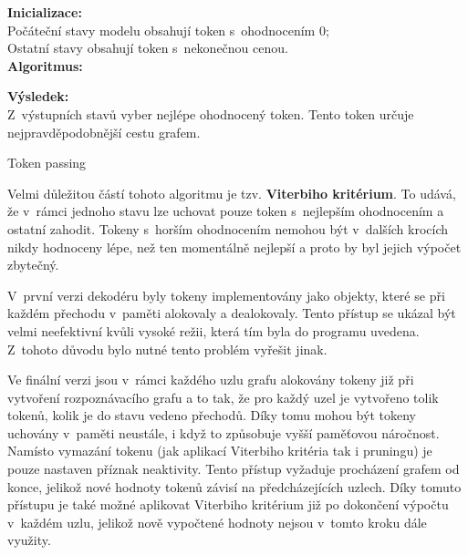 \begin{center}
\begin{czechalgorithm}[H] \label{alg:token_passing}
	\textbf{Inicializace:}\\
    Počáteční stavy modelu obsahují token s~ohodnocením 0;\\
    Ostatní stavy obsahují token s~nekonečnou cenou.\\
    \textbf{Algoritmus:}\\
    
    \textbf{Výsledek:}\\
    Z~výstupních stavů vyber nejlépe ohodnocený token. Tento token určuje nejpravděpodobnější cestu grafem.
 \caption{Token passing}
\end{czechalgorithm}
\end{center}

Velmi důležitou částí tohoto algoritmu je tzv. \textbf{Viterbiho kritérium}. To udává, že v~rámci jednoho stavu lze uchovat pouze token s~nejlepším ohodnocením a ostatní zahodit. Tokeny s~horším ohodnocením nemohou být v~dalších krocích nikdy hodnoceny lépe, než ten momentálně nejlepší a proto by byl jejich výpočet zbytečný. 

V~první verzi dekodéru byly tokeny implementovány jako objekty, které se při každém přechodu v~paměti alokovaly a dealokovaly. Tento přístup se ukázal být velmi neefektivní kvůli vysoké režii, která tím byla do programu uvedena. Z~tohoto důvodu bylo nutné tento problém vyřešit jinak.

Ve finální verzi jsou v~rámci každého uzlu grafu alokovány tokeny již při vytvoření rozpoznávacího grafu a to tak, že pro každý uzel je vytvořeno tolik tokenů, kolik je do stavu vedeno přechodů. Díky tomu mohou být tokeny uchovány v~paměti neustále, i když to způsobuje vyšší paměťovou náročnost. Namísto vymazání tokenu (jak aplikací Viterbiho kritéria tak i pruningu) je pouze nastaven příznak neaktivity. Tento přístup vyžaduje procházení grafem od konce, jelikož nové hodnoty tokenů závisí na předcházejících uzlech. Díky tomuto přístupu je také možné aplikovat Viterbiho kritérium již po dokončení výpočtu v~každém uzlu, jelikož nově vypočtené hodnoty nejsou v~tomto kroku dále využity.


